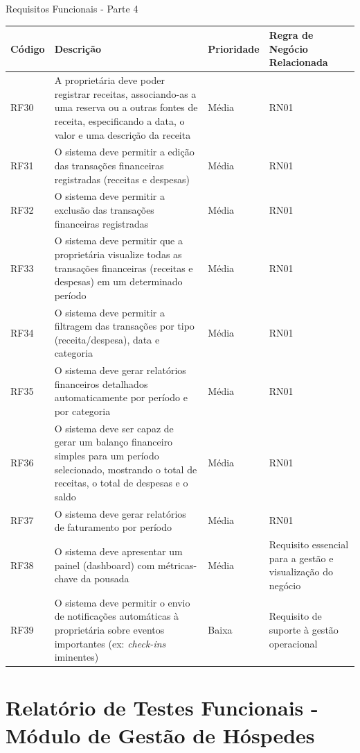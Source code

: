 \documentclass[
	12pt,				%
	openany,			%
	oneside,			%
	a4paper,			%
	english,			%
	french,				%
	spanish,			%
	brazil				%
	]{abntex2}
\begin{document}
\begin{apendicesenv}
\begin{quadro}[H]
	\caption{Requisitos Funcionais - Parte 4}
	\label{quadro_rfc4}
	\begin{tabular}{|>{\centering\arraybackslash}p{1.5cm}|p{6.7cm}|>{\centering\arraybackslash}p{2cm}|>{\centering\arraybackslash}p{4cm}|}
		\hline
		\textbf{Código} & \textbf{Descrição} & \textbf{Prioridade} & \textbf{Regra de Negócio Relacionada} \\ \hline
		RF30 & A proprietária deve poder registrar receitas, associando-as a uma reserva ou a outras fontes de receita, especificando a data, o valor e uma descrição da receita & Média & RN01
		 \\ \hline
		RF31 & O sistema deve permitir a edição das transações financeiras registradas (receitas e despesas) & Média & RN01 
		\\ \hline
		RF32 & O sistema deve permitir a exclusão das transações financeiras registradas & Média & RN01
		 \\ \hline
		RF33 & O sistema deve permitir que a proprietária visualize todas as transações financeiras (receitas e despesas) em um determinado período & Média & RN01 
		\\ \hline
		RF34 & O sistema deve permitir a filtragem das transações por tipo (receita/despesa), data e categoria & Média & RN01
		 \\ \hline
		RF35 & O sistema deve gerar relatórios financeiros detalhados automaticamente por período e por categoria & Média & RN01
		\\ \hline
		RF36 & O sistema deve ser capaz de gerar um balanço financeiro simples para um período selecionado, mostrando o total de receitas, o total de despesas e o saldo & Média & RN01
		\\ \hline
		RF37 & O sistema deve gerar relatórios de faturamento por período & Média & RN01
		\\ \hline
		RF38 & O sistema deve apresentar um painel (dashboard) com métricas-chave da pousada & Média & Requisito essencial para a gestão e visualização do negócio 
		\\ \hline
		RF39 & O sistema deve permitir o envio de notificações automáticas à proprietária sobre eventos importantes (ex: \textit{check-ins} iminentes)
		& Baixa & Requisito de suporte à gestão operacional \\ \hline
	\end{tabular}
\end{quadro}
%

\chapter{Relatório de Testes Funcionais - Módulo de Gestão de Hóspedes} 
	

\end{apendicesenv}
\end{document}
